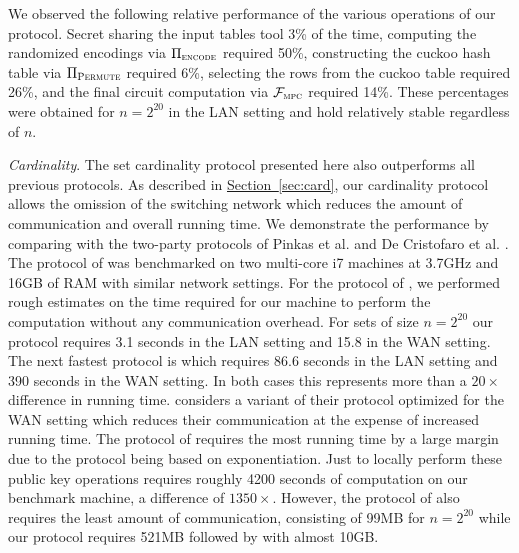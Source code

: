 \documentclass[11pt,letterpaper]{article}
\newcommand{\namedref}[2]{\hyperref[#2]{#1~\ref*{#2}}}
\newcommand{\sectionref}[1]{\namedref{Section}{#1}}
\renewcommand{\paragraph}[1]{\vspace{0.1cm}\noindent\emph{#1}.}
\newcommand{\f}[1]{\ensuremath{\mathcal{F}_{\textsc{#1}}}}
\newcommand{\proto}[1]{\ensuremath{\Pi_{\textsc{#1}}}}
\begin{document}
We observed the following relative performance of the various operations of our protocol. Secret sharing the input tables tool 3\% of the time, computing the randomized encodings via \proto{encode} required 50\%, constructing the cuckoo hash table via \proto{Permute} required 6\%, selecting the rows from the cuckoo table required 26\%, and the final circuit computation via \f{mpc} required 14\%. These percentages were obtained for $n=2^{20}$ in the LAN setting and hold relatively stable regardless of $n$.



\paragraph{Cardinality} The set cardinality protocol presented here also outperforms all previous protocols. As described in \sectionref{sec:card}, our cardinality protocol allows the omission of the switching network which reduces the amount of communication and overall running time. We demonstrate the performance by comparing with the two-party protocols of Pinkas et al. \cite{PSWW18} and De Cristofaro et al. \cite{DBLP:conf/cans/CristofaroGT12}. The protocol of  \cite{PSWW18} was benchmarked on two multi-core i7 machines at 3.7GHz and 16GB of RAM with similar network settings. For the protocol of \cite{DBLP:conf/cans/CristofaroGT12}, we performed rough estimates on the time required for our machine to perform the computation without any communication overhead. For sets of size $n=2^{20}$ our protocol requires 3.1 seconds in the LAN setting and 15.8 in the WAN setting. The next fastest protocol is \cite{PSWW18} which requires 86.6 seconds in the LAN setting and 390 seconds in the WAN setting. In both cases this represents more than a $20\times$ difference in running time.  \cite{PSWW18} considers a variant of their protocol optimized for the WAN setting which reduces their communication at the expense of increased running time. The protocol of \cite{DBLP:conf/cans/CristofaroGT12} requires the most running time by a large margin due to the protocol being based on exponentiation. Just to locally perform these public key operations requires roughly 4200 seconds of computation on our benchmark machine, a difference of $1350\times$. However, the protocol of \cite{DBLP:conf/cans/CristofaroGT12} also requires the least amount of communication, consisting of 99MB for $n=2^{20}$ while our protocol requires 521MB followed by \cite{PSWW18}  with almost 10GB.
\end{document}
